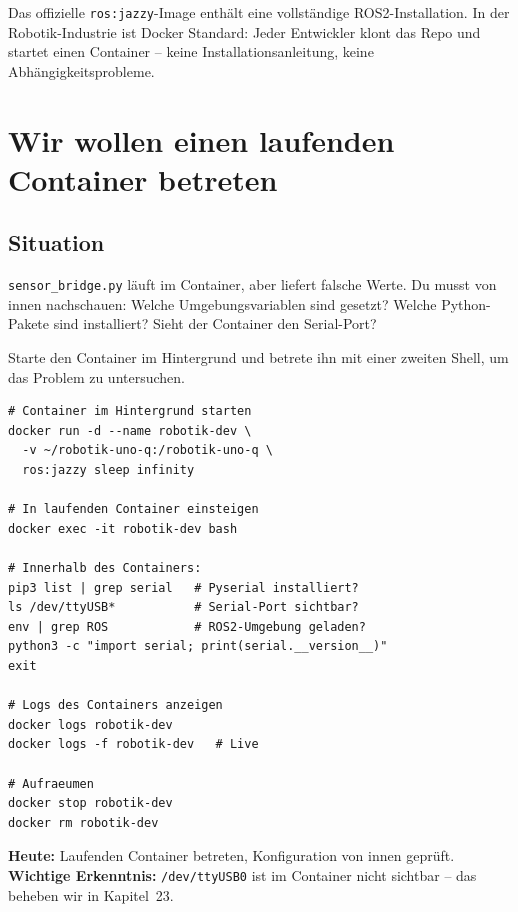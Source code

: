 \begin{robotikBox}
Das offizielle \texttt{ros:jazzy}-Image enthält eine vollständige
ROS2-Installation. In der Robotik-Industrie ist Docker Standard:
Jeder Entwickler klont das Repo und startet einen Container --
keine Installationsanleitung, keine Abhängigkeitsprobleme.
\end{robotikBox}

\chapter{Wir wollen einen laufenden Container betreten}

\kapitelstruktur

\section{Situation}

\texttt{sensor\_bridge.py} läuft im Container, aber liefert
falsche Werte. Du musst von innen nachschauen:
Welche Umgebungsvariablen sind gesetzt? Welche Python-Pakete
sind installiert? Sieht der Container den Serial-Port?

\begin{aufgabeBox}
Starte den Container im Hintergrund und betrete ihn
mit einer zweiten Shell, um das Problem zu untersuchen.
\end{aufgabeBox}

\begin{lstlisting}[style=bash]
# Container im Hintergrund starten
docker run -d --name robotik-dev \
  -v ~/robotik-uno-q:/robotik-uno-q \
  ros:jazzy sleep infinity

# In laufenden Container einsteigen
docker exec -it robotik-dev bash

# Innerhalb des Containers:
pip3 list | grep serial   # Pyserial installiert?
ls /dev/ttyUSB*           # Serial-Port sichtbar?
env | grep ROS            # ROS2-Umgebung geladen?
python3 -c "import serial; print(serial.__version__)"
exit

# Logs des Containers anzeigen
docker logs robotik-dev
docker logs -f robotik-dev   # Live

# Aufraeumen
docker stop robotik-dev
docker rm robotik-dev
\end{lstlisting}

\begin{projektBox}
\textbf{Heute:} Laufenden Container betreten, Konfiguration
von innen geprüft.\\
\textbf{Wichtige Erkenntnis:} \texttt{/dev/ttyUSB0} ist im Container
nicht sichtbar -- das beheben wir in Kapitel~23.
\end{projektBox}

